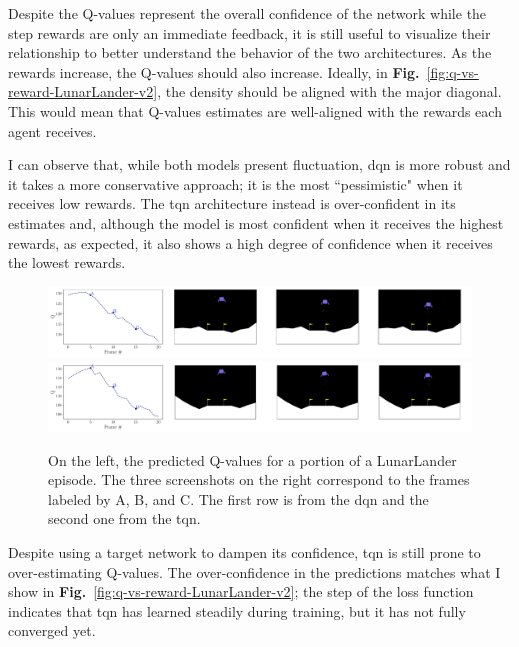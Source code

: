 Despite the Q-values represent the overall confidence of the network while the step rewards are only an immediate feedback, it is still useful to visualize their relationship to better understand the behavior of the two architectures. As the rewards increase, the Q-values should also increase. Ideally, in \textbf{Fig.}~\ref{fig:q-vs-reward-LunarLander-v2}, the density should be aligned with the major diagonal. This would mean that Q-values estimates are well-aligned with the rewards each agent receives.

I can observe that, while both models present fluctuation, \acrshort{dqn} is more robust and it takes a more conservative approach; it is the most ``pessimistic" when it receives low rewards. The \acrshort{tqn} architecture instead is over-confident in its estimates and, although the model is most confident when it receives the highest rewards, as expected, it also shows a high degree of confidence when it receives the lowest rewards.

\begin{figure}[!htbp]
\centering
\includegraphics[width=\textwidth]{images/q-vs-frame_DQN_LunarLander-v2.pdf}
\includegraphics[width=\textwidth]{images/q-vs-frame_TQN_LunarLander-v2.pdf}
\caption{On the left, the predicted Q-values for a portion of a LunarLander episode. The three screenshots on the right correspond to the frames labeled by A, B, and C. The first row is from the \acrlong{dqn} and the second one from the \acrlong{tqn}.}
\label{fig:q-vs-screenshot-TQN-LunarLander-v2}
\end{figure}

Despite using a target network to dampen its confidence, \acrshort{tqn} is still prone to over-estimating Q-values. The over-confidence in the predictions matches what I show in \textbf{Fig.}~\ref{fig:q-vs-reward-LunarLander-v2}; the step of the loss function indicates that \acrshort{tqn} has learned steadily during training, but it has not fully converged yet.


